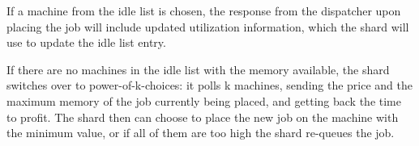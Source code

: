 If a machine from the idle list is chosen, the response from the dispatcher upon
placing the job will include updated utilization information, which the shard
will use to update the idle list entry.

If there are no machines in the idle list with the memory available, the shard
switches over to power-of-k-choices: it polls k machines, sending the price and
the maximum memory of the job currently being placed, and getting back the time
to profit. The shard then can choose to place the new job on the machine with
the minimum value, or if all of them are too high the shard re-queues the job.

